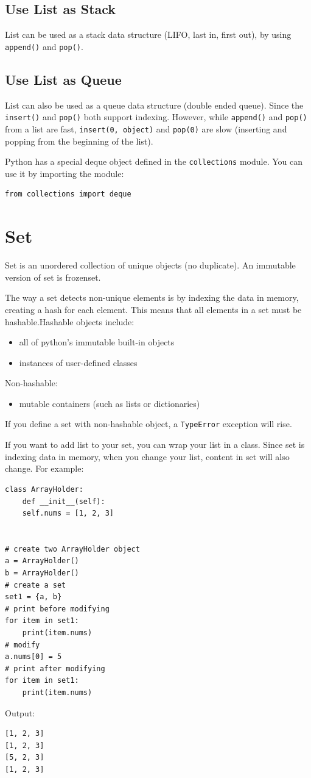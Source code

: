 \documentclass[12pt]{book}
\begin{document}
\subsection{Use List as Stack}
\label{sec:org222b224}
List can be used as a stack data structure (LIFO, last in, first out), by using \texttt{append()} and \texttt{pop()}.
\subsection{Use List as Queue}
\label{sec:orga670f04}
List can also be used as a queue data structure (double ended queue). Since the \texttt{insert()} and \texttt{pop()} both support indexing. However, while \texttt{append()} and \texttt{pop()} from a list are fast, \texttt{insert(0, object)} and \texttt{pop(0)} are slow (inserting and popping from the beginning of the list).

Python has a special deque object defined in the \texttt{collections} module. You can use it by importing the module:
\begin{verbatim}
from collections import deque
\end{verbatim}
\section{Set}
\label{sec:org6060301}
Set is an unordered collection of unique objects (no duplicate). An immutable version of set is frozenset.

The way a set detects non-unique elements is by indexing the data in memory, creating a hash for each element. This means that all elements in a set must be hashable.Hashable objects include:
\begin{itemize}
\item all of python's immutable built-in objects
\item instances of user-defined classes
\end{itemize}

Non-hashable:
\begin{itemize}
\item mutable containers (such as lists or dictionaries)
\end{itemize}

If you define a set with non-hashable object, a \texttt{TypeError} exception will rise.

If you want to add list to your set, you can wrap your list in a class. Since set is indexing data in memory, when you change your list, content in set will also change. For example:
\begin{verbatim}
class ArrayHolder:
    def __init__(self):
	self.nums = [1, 2, 3]


# create two ArrayHolder object
a = ArrayHolder()
b = ArrayHolder()
# create a set
set1 = {a, b}
# print before modifying 
for item in set1:
    print(item.nums)
# modify
a.nums[0] = 5
# print after modifying
for item in set1:
    print(item.nums)
\end{verbatim}
Output:
\begin{verbatim}
[1, 2, 3]
[1, 2, 3]
[5, 2, 3]
[1, 2, 3]
\end{verbatim}
\end{document}
